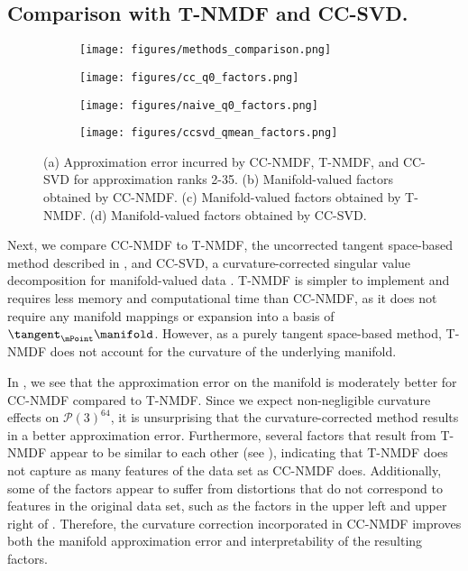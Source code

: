 \subsection{Comparison with T-NMDF and CC-SVD.}
\label{sec:numerics vs naive}
\begin{figure}[t!]
    \centering
    \begin{subfigure}{0.48\linewidth}
        \texttt{[image: figures/methods\_comparison.png]}
    \caption{}
    \label{fig:naive_vs_cc_loss}
    \end{subfigure}
    \hfill
    \begin{subfigure}{0.48\linewidth}
        \texttt{[image: figures/cc\_q0\_factors.png]}
        \caption{}
        \label{fig:cc_q0_factors}
    \end{subfigure}
    \begin{subfigure}{0.48\linewidth}
        \texttt{[image: figures/naive\_q0\_factors.png]}
        \caption{}
        \label{fig:naive_q0_factors}
    \end{subfigure}
    \hfill
    \begin{subfigure}{0.48\linewidth}
        \texttt{[image: figures/ccsvd\_qmean\_factors.png]}
        \caption{}
        \label{fig:CC-SVD_qmean_factors}
    \end{subfigure}
    \caption{(a) Approximation error incurred by CC-NMDF, T-NMDF, and CC-SVD for approximation ranks 2-35. (b) Manifold-valued factors obtained by CC-NMDF. (c) Manifold-valued factors obtained by T-NMDF. (d) Manifold-valued factors obtained by CC-SVD.}
\end{figure}
Next, we compare CC-NMDF to T-NMDF, the uncorrected tangent space-based method described in , and CC-SVD, a curvature-corrected singular value decomposition for manifold-valued data \citep{diepeveen2023curvature}. T-NMDF is simpler to implement and requires less memory and computational time than CC-NMDF, as it does not require any manifold mappings or expansion into a basis of $\tangent_\mPoint \manifold$. However, as a purely tangent space-based method, T-NMDF does not account for the curvature of the underlying manifold. 


In , we see that the approximation error on the manifold is moderately better for CC-NMDF compared to T-NMDF. Since we expect non-negligible curvature effects on $\mathcal{P}(3)^{64}$, it is unsurprising that the curvature-corrected method results in a better approximation error. Furthermore, several factors that result from T-NMDF appear to be similar to each other (see ), indicating that T-NMDF does not capture as many features of the data set as CC-NMDF does. Additionally, some of the factors appear to suffer from distortions that do not correspond to features in the original data set, such as the factors in the upper left and upper right of . Therefore, the curvature correction incorporated in CC-NMDF improves both the manifold approximation error and interpretability of the resulting factors. 

